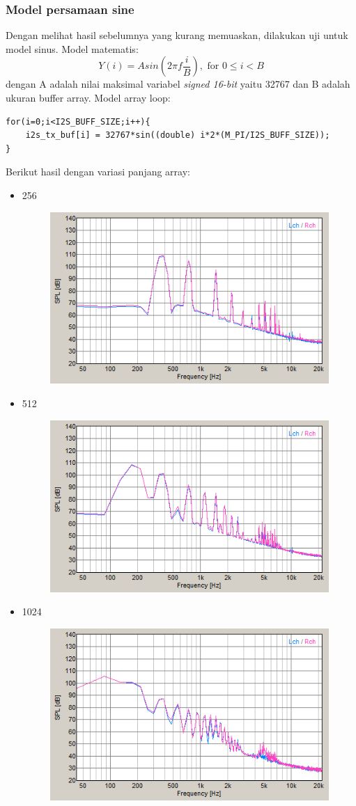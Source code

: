 \documentclass[12pt,]{article}
\begin{document}
 	 \newpage
 	 \subsubsection{Model persamaan sine}
 	 Dengan melihat hasil sebelumnya yang kurang memuaskan, dilakukan uji untuk model sinus.
 	 Model matematis:
 	 \[ Y(i) = A sin(2\pi f \frac{i}{B}), \text{ for } 0 \leq i < B \]
 	 dengan A adalah nilai maksimal variabel \textit{signed 16-bit} yaitu 32767
 	 dan B adalah ukuran buffer array.
 	 Model array loop:
 	 \begin{verbatim}
for(i=0;i<I2S_BUFF_SIZE;i++){
	i2s_tx_buf[i] = 32767*sin((double) i*2*(M_PI/I2S_BUFF_SIZE));
}
 	 \end{verbatim}
 	 Berikut hasil dengan variasi panjang array:
 	 \begin{itemize}
 	 	\item 256
 	 	\begin{figure}[H]
 	 		\centering
 	 		\includegraphics[width=0.45\linewidth]{result/day_1/max256}
 	 	\end{figure}

  		\item 512
  		\begin{figure}[H]
  			\centering
  			\includegraphics[width=0.45\linewidth]{result/day_1/max512}
  		\end{figure}

  		\item 1024
  		\begin{figure}[H]
  			\centering
  			\includegraphics[width=0.45\linewidth]{result/day_1/max1024}
  		\end{figure}
 	 \end{itemize}
\end{document}
